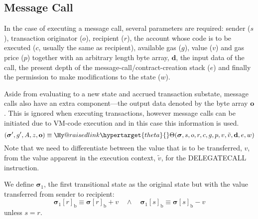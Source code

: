 \documentclass[9pt,oneside]{amsart}
\makeatletter
\newcommand{\linkdest}[1]{\Hy@raisedlink{\hypertarget{#1}{}}}
\makeatother
\begin{document}
\begin{multicols}{2}
\section{Message Call} \label{ch:call}
In the case of executing a message call, several parameters are required: sender ($s$), transaction originator ($o$), recipient ($r$), the account whose code is to be executed ($c$, usually the same as recipient), available gas ($g$), value ($v$) and gas price ($p$) together with an arbitrary length byte array, $\mathbf{d}$, the input data of the call, the present depth of the message-call/contract-creation stack ($e$) and finally the permission to make modifications to the state ($w$).

Aside from evaluating to a new state and accrued transaction substate, message calls also have an extra component---the output data denoted by the byte array $\mathbf{o}$. This is ignored when executing transactions, however message calls can be initiated due to VM-code execution and in this case this information is used.
\begin{equation}
(\boldsymbol{\sigma}', g', A, z, \mathbf{o}) \equiv \linkdest{theta}{\Theta}(\boldsymbol{\sigma}, s, o, r, c, g, p, v, \tilde{v}, \mathbf{d}, e, w)
\end{equation}
Note that we need to differentiate between the value that is to be transferred, $v$, from the value apparent in the execution context, $\tilde{v}$, for the {\small DELEGATECALL} instruction.

We define $\boldsymbol{\sigma}_1$, the first transitional state as the original state but with the value transferred from sender to recipient:
\begin{equation}
\boldsymbol{\sigma}_1[r]_{\mathrm{b}} \equiv \boldsymbol{\sigma}[r]_{\mathrm{b}} + v \quad\wedge\quad \boldsymbol{\sigma}_1[s]_{\mathrm{b}} \equiv \boldsymbol{\sigma}[s]_{\mathrm{b}} - v
\end{equation}
unless $s = r$.


\end{multicols}
\end{document}
